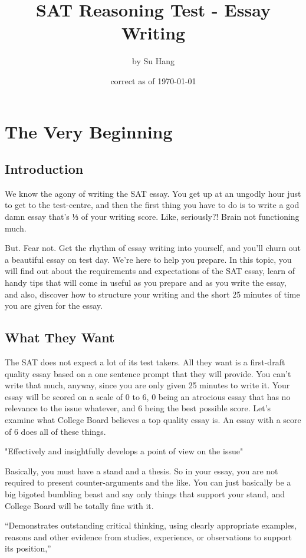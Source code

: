 \documentclass[DIV=calc,11pt,parskip,numbers=noenddot]{scrartcl} %
\title{SAT Reasoning Test - Essay Writing}
\author{\large by Su Hang}
\date{\small correct as of \today}
\begin{document}
\maketitle
\tableofcontents
\section{The Very Beginning}
\subsection{Introduction}
We know the agony of writing the SAT essay. You get up at an ungodly hour just to get to the test-centre, and then the first thing you have to do is to write a god damn essay that’s ⅓ of your writing score. Like, seriously?! Brain not functioning much.

But. Fear not. Get the rhythm of essay writing into yourself, and you’ll churn out a beautiful essay on test day. We’re here to help you prepare. In this topic, you will find out about the requirements and expectations of the SAT essay, learn of handy tips that will come in useful as you prepare and as you write the essay, and also, discover how to structure your writing and the short 25 minutes of time you are given for the essay.
\subsection{What They Want}
The SAT does not expect a lot of its test takers. All they want is a first-draft quality essay based on a one sentence prompt that they will provide. You can’t write that much, anyway, since you are only given 25 minutes to write it. Your essay will be scored on a scale of 0 to 6, 0 being an atrocious essay that has no relevance to the issue whatever, and 6 being the best possible score. Let’s examine what College Board believes a top quality essay is. An essay with a score of 6 does all of these things.

"Effectively and insightfully develops a point of view on the issue"

Basically, you must have a stand and a thesis. So in your essay, you are not required to present counter-arguments and the like. You can just basically be a big bigoted bumbling beast and say only things that support your stand, and College Board will be totally fine with it.

“Demonstrates outstanding critical thinking, using clearly appropriate examples, reasons and other evidence from studies, experience, or observations to support its position,”
\end{document}
